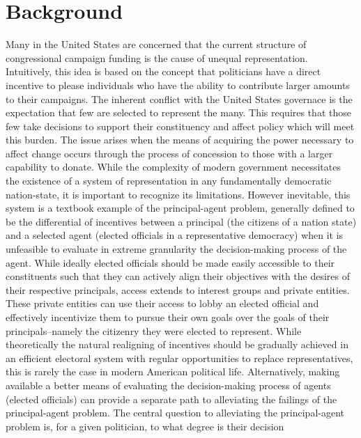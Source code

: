 \documentclass[journal]{IEEEtran}
\begin{document}
\IEEEpeerreviewmaketitle



\section{Background}
Many in the United States are concerned that the current structure of congressional campaign funding is the cause of 
unequal representation. Intuitively, this idea is based on the concept that politicians have a direct incentive to please
individuals who have the ability to contribute larger amounts to their campaigns. The inherent conflict with the United States governace is the expectation that few are selected
to represent the many. This requires that those few take decisions to support their constituency and affect policy which
will meet this burden. The issue arises when the means of acquiring the power necessary to affect change occurs through 
the process of concession to those with a larger capability to donate.
While the complexity of modern government necessitates the existence of a system of representation in any fundamentally 
democratic nation-state, it is important to recognize its limitations. However inevitable, this system is a textbook 
example of the principal-agent problem, generally defined to be the differential of incentives between a principal (the 
citizens of a nation state) and a selected agent (elected officials in a representative democracy) when it is unfeasible 
to evaluate in extreme granularity the decision-making process of the agent. While ideally elected officials should be 
made easily accessible to their constituents such that they can actively align their objectives with the desires of their 
respective principals, access extends to interest groups and private entities. These private entities can use their 
access to lobby an elected official and effectively incentivize them to pursue their own goals over the goals of their 
principals--namely the citizenry they were elected to represent. While theoretically the natural realigning of incentives 
should be gradually achieved in an efficient electoral system with regular opportunities to replace representatives, this 
is rarely the case in modern American political life. Alternatively, making available a better means of evaluating the 
decision-making process of agents (elected officials) can provide a separate path to alleviating the failings of the 
principal-agent problem.\newline
  The central question to alleviating the principal-agent problem is, for a given politician, to what degree is their decision 
\end{document}
